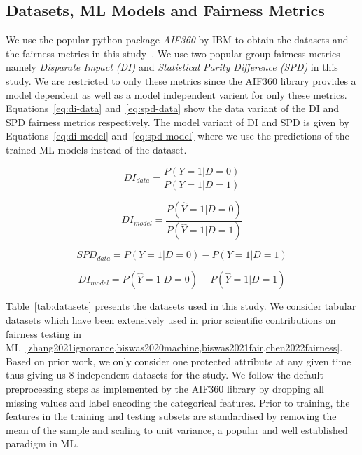 \documentclass{article}
\begin{document}
\subsection{Datasets, ML Models and Fairness Metrics}\label{sec:method-parameters}

We use the popular python package \emph{AIF360} by IBM to obtain the
datasets and the fairness metrics in this study \cite{bellamy2019ai}.
We use two popular group fairness metrics namely \emph{Disparate
Impact (DI)} and \emph{Statistical Parity Difference (SPD)} in this
study. We are restricted to only these metrics since the AIF360
library provides a model dependent as well as a model independent
varient for only these metrics. Equations \ref{eq:di-data}
and \ref{eq:spd-data} show the data variant of the DI and SPD fairness
metrics respectively. The model variant of DI and SPD is given by
Equations \ref{eq:di-model} and \ref{eq:spd-model} where we use the
predictions of the trained ML models instead of the dataset.

\begin{equation}
  DI_{data} = \frac{P(Y=1|D=0)}{P(Y=1|D=1)}
  \label{eq:di-data}
\end{equation}

\begin{equation}
  DI_{model} = \frac{P(\hat{Y}=1|D=0)}{P(\hat{Y}=1|D=1)}
  \label{eq:di-model}
\end{equation}

\begin{equation}
  SPD_{data} = P(Y=1|D=0)-P(Y=1|D=1)
  \label{eq:spd-data}
\end{equation}

\begin{equation}
  DI_{model} = P(\hat{Y}=1|D=0)-P(\hat{Y}=1|D=1)
  \label{eq:spd-model}
\end{equation}

Table \ref{tab:datasets} presents the datasets used in this study. We
consider tabular datasets which have been extensively used in prior
scientific contributions on fairness testing in
ML \ref{zhang2021ignorance,biswas2020machine,biswas2021fair,chen2022fairness}.
Based on prior work, we only consider one protected attribute at any
given time thus giving us 8 independent datasets for the study. We
follow the default preprocessing steps as implemented by the AIF360
library by dropping all missing values and label encoding the
categorical features. Prior to training, the features in the training
and testing subsets are standardised by removing the mean of the
sample and scaling to unit variance, a popular and well established
paradigm in ML.
\end{document}

